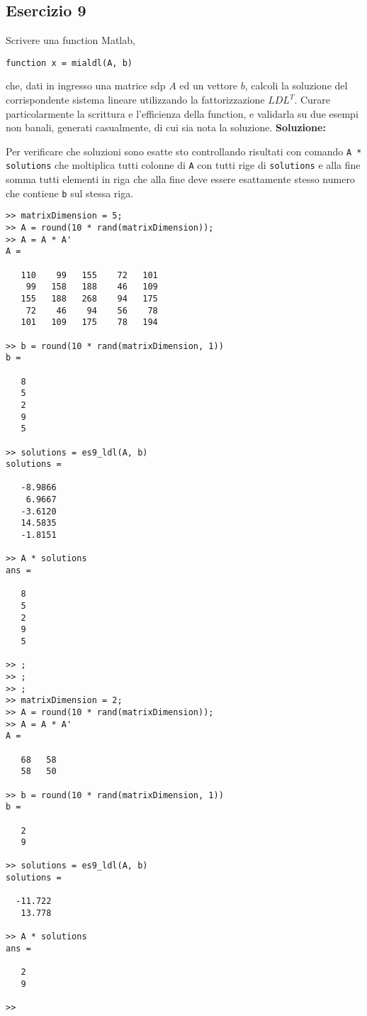 \subsection{Esercizio 9}
Scrivere una function Matlab,
\begin{lstlisting}
function x = mialdl(A, b)
\end{lstlisting}
che, dati in ingresso una matrice sdp $A$ ed un vettore $b$, calcoli la soluzione
del corrispondente sistema lineare utilizzando la fattorizzazione $LDL^T$.
Curare particolarmente la scrittura e l'efficienza della function,
e validarla su due esempi non banali, generati casualmente, di cui sia nota la soluzione.
\newline \textbf{Soluzione:} \newline

Per verificare che soluzioni sono esatte sto controllando risultati con comando \lstinline{A * solutions}
che moltiplica tutti colonne di \lstinline{A} con tutti rige di \lstinline{solutions} e alla fine somma tutti
elementi in riga che alla fine deve essere esattamente stesso numero
che contiene \lstinline{b} sul stessa riga.
\begin{lstlisting}
>> matrixDimension = 5;
>> A = round(10 * rand(matrixDimension));
>> A = A * A'
A =

   110    99   155    72   101
    99   158   188    46   109
   155   188   268    94   175
    72    46    94    56    78
   101   109   175    78   194

>> b = round(10 * rand(matrixDimension, 1))
b =

   8
   5
   2
   9
   5

>> solutions = es9_ldl(A, b)
solutions =

   -8.9866
    6.9667
   -3.6120
   14.5835
   -1.8151

>> A * solutions
ans =

   8
   5
   2
   9
   5

>> ;
>> ;
>> ;
>> matrixDimension = 2;
>> A = round(10 * rand(matrixDimension));
>> A = A * A'
A =

   68   58
   58   50

>> b = round(10 * rand(matrixDimension, 1))
b =

   2
   9

>> solutions = es9_ldl(A, b)
solutions =

  -11.722
   13.778

>> A * solutions
ans =

   2
   9

>>
\end{lstlisting}
